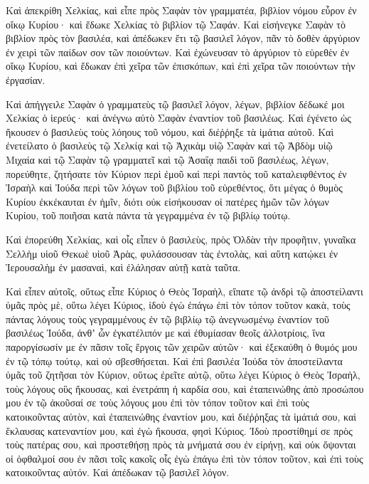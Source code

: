 {Καὶ ἀπεκρίθη Χελκίας, καὶ εἶπε πρὸς Σαφὰν τὸν γραμματέα, βιβλίον νόμου εὗρον ἐν οἴκῳ Κυρίου· καὶ ἔδωκε Χελκίας τὸ βιβλίον τῷ Σαφάν.
Καὶ εἰσήνεγκε Σαφὰν τὸ βιβλίον πρὸς τὸν βασιλέα, καὶ ἀπέδωκεν ἔτι τῷ βασιλεῖ λόγον, πᾶν τὸ δοθὲν ἀργύριον ἐν χειρὶ τῶν παίδων σον τῶν ποιούντων.
Καὶ ἐχώνευσαν τὸ ἀργύριον τὸ εὑρεθὲν ἐν οἴκῳ Κυρίου, καὶ ἔδωκαν ἐπὶ χεῖρα τῶν ἐπισκόπων, καὶ ἐπὶ χεῖρα τῶν ποιούντων τὴν ἐργασίαν.
\par }{\PP {}Καὶ ἀπήγγειλε Σαφὰν ὁ γραμματεὺς τῷ βασιλεῖ λόγον, λέγων, βιβλίον δέδωκέ μοι Χελκίας ὁ ἱερεύς· καὶ ἀνέγνω αὐτὸ Σαφὰν ἐναντίον τοῦ βασιλέως.
Καὶ ἐγένετο ὡς ἤκουσεν ὁ βασιλεὺς τοὺς λόηους τοῦ νόμου, καὶ διέῤῥηξε τὰ ἱμάτια αὐτοῦ.
Καὶ ἐνετείλατο ὁ βασιλεὺς τῷ Χελκίᾳ καὶ τῷ Ἀχικὰμ υἱῷ Σαφὰν καὶ τῷ Ἀβδὸμ υἱῷ Μιχαία καὶ τῷ Σαφὰν τῷ γραμματεῖ καὶ τῷ Ἀσαΐᾳ παιδὶ τοῦ βασιλέως, λέγων,
πορεύθητε, ζητήσατε τὸν Κύριον περὶ ἐμοῦ καὶ περὶ παντὸς τοῦ καταλειφθέντος ἐν Ἰσραὴλ καὶ Ἰούδα περὶ τῶν λόγων τοῦ βιβλίου τοῦ εὑρεθέντος, ὅτι μέγας ὁ θυμὸς Κυρίου ἐκκέκαυται ἐν ἡμῖν, διότι οὐκ εἰσήκουσαν οἱ πατέρες ἡμῶν τῶν λόγων Κυρίου, τοῦ ποιῆσαι κατὰ πάντα τὰ γεγραμμένα ἐν τῷ βιβλίῳ τούτῳ.
\par }{\PP {}Καὶ ἐπορεύθη Χελκίας, καὶ οἷς εἶπεν ὁ βασιλεὺς, πρὸς Ὀλδὰν τὴν προφῆτιν, γυναῖκα Σελλὴμ υἱοῦ Θεκωὲ υἱοῦ Ἀρὰς, φυλάσσουσαν τὰς ἐντολὰς, καὶ αὕτη κατῴκει ἐν Ἱερουσαλὴμ ἐν μασαναὶ, καὶ ἐλάλησαν αὐτῇ κατὰ ταῦτα.
\par }{\PP {}Καὶ εἶπεν αὐτοῖς, οὕτως εἶπε Κύριος ὁ Θεὸς Ἰσραὴλ, εἴπατε τῷ ἀνδρὶ τῷ ἀποστείλαντι ὑμᾶς πρὸς μὲ,
οὕτω λέγει Κύριος, ἰδοὺ ἐγὼ ἐπάγω ἐπὶ τὸν τόπον τοῦτον κακὰ, τοὺς πάντας λόγους τοὺς γεγραμμένους ἐν τῷ βιβλίῳ τῷ ἀνεγνωσμένῳ ἐναντίον τοῦ βασιλέως Ἰούδα,
ἀνθʼ ὧν ἐγκατέλιπόν με καὶ ἐθυμίασαν θεοῖς ἀλλοτρίοις, ἵνα παροργίσωσίν με ἐν πᾶσιν τοῖς ἔργοις τῶν χειρῶν αὐτῶν· καὶ ἐξεκαύθη ὁ θυμός μου ἐν τῷ τόπῳ τούτῳ, καὶ οὐ σβεσθήσεται.
Καὶ ἐπὶ βασιλέα Ἰούδα τὸν ἀποστείλαντα ὑμᾶς τοῦ ζητῆσαι τὸν Κύριον, οὕτως ἐρεῖτε αὐτῷ, οὕτω λέγει Κύριος ὁ Θεὸς Ἰσραὴλ, τοὺς λόγους οὓς ἤκουσας,
καὶ ἐνετράπη ἡ καρδία σου, καὶ ἐταπεινώθης ἀπὸ προσώπου μου ἐν τῷ ἀκοῦσαί σε τοὺς λόγους μου ἐπὶ τὸν τόπον τοῦτον καὶ ἐπὶ τοὺς κατοικοῦντας αὐτὸν, καὶ ἐταπεινώθης ἐναντίον μου, καὶ διέῤῥηξας τὰ ἱμάτιά σου, καὶ ἔκλαυσας κατεναντίον μου, καὶ ἐγὼ ἤκουσα, φησὶ Κύριος.
Ἰδοὺ προστίθημί σε πρὸς τοὺς πατέρας σου, καὶ προστεθήσῃ πρὸς τὰ μνήματά σου ἐν εἰρήνῃ, καὶ οὐκ ὄψονται οἱ ὀφθαλμοί σου ἐν πᾶσι τοῖς κακοῖς οἷς ἐγὼ ἐπάγω ἐπὶ τὸν τόπον τοῦτον, καὶ ἐπὶ τοὺς κατοικοῦντας αὐτόν. Καὶ ἀπέδωκαν τῷ βασιλεῖ λόγον.
}
